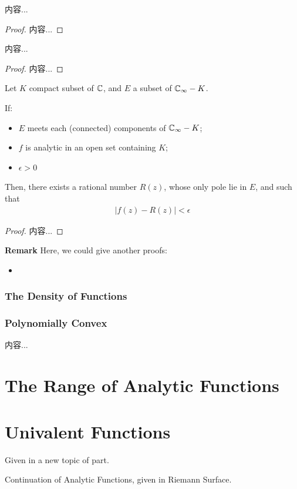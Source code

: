 \documentclass[Total.tex]{subfiles}
\begin{document}
			\begin{lemma}
				内容...
			\end{lemma}
			\begin{proof}
				内容...
			\end{proof}
			
			\begin{lemma}
				内容...
			\end{lemma}
			\begin{proof}
				内容...
			\end{proof}
			
			\begin{theorem}
				Let $K$ compact subset of $\mathbb{C}$, and $E$ a subset of $\mathbb{C}_\infty-K$. 
				
				If: 
				\begin{itemize}
					\item $E$ meets each (connected) components of $\mathbb{C}_\infty-K$;
					\item $f$ is analytic in an open set containing $K$;
					\item $\epsilon>0$
				\end{itemize}
				
				Then, there exists a rational number $R(z)$, whose only pole lie in $E$, and such that
				\begin{gather*}
					|f(z)-R(z)|<\epsilon
				\end{gather*}
			\end{theorem}
			\begin{proof}
				内容...
			\end{proof}
			
			
			\textbf{Remark} Here, we could give another proofs:
			\begin{itemize}
				\item 
			\end{itemize}
			\subsection{The Density of Functions}
			\subsection{Polynomially Convex}
			\begin{Def}
				内容...
			\end{Def}
			
			
	\chapter{The Range of Analytic Functions}
	\chapter{Univalent Functions}
		Given in a new topic of part.
	
	\newpage
	
	Continuation of Analytic Functions, given in Riemann Surface.
\end{document}

